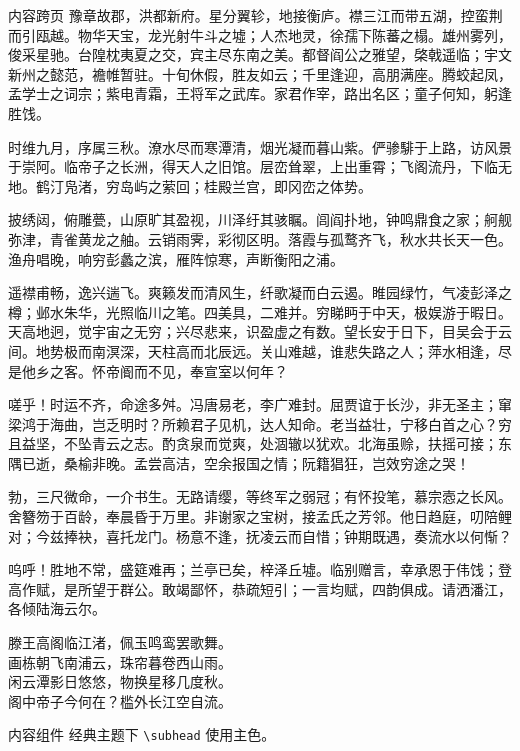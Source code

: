 \documentclass[aspectratio=169]{ctexbeamer} %
\begin{document}
\begin{frame}[allowframebreaks]{内容跨页}
  豫章故郡，洪都新府。星分翼轸，地接衡庐。襟三江而带五湖，控蛮荆而引瓯越。物华天宝，龙光射牛斗之墟；人杰地灵，徐孺下陈蕃之榻。雄州雾列，俊采星驰。台隍枕夷夏之交，宾主尽东南之美。都督阎公之雅望，棨戟遥临；宇文新州之懿范，襜帷暂驻。十旬休假，胜友如云；千里逢迎，高朋满座。腾蛟起凤，孟学士之词宗；紫电青霜，王将军之武库。家君作宰，路出名区；童子何知，躬逢胜饯。

  时维九月，序属三秋。潦水尽而寒潭清，烟光凝而暮山紫。俨骖騑于上路，访风景于崇阿。临帝子之长洲，得天人之旧馆。层峦耸翠，上出重霄；飞阁流丹，下临无地。鹤汀凫渚，穷岛屿之萦回；桂殿兰宫，即冈峦之体势。

  披绣闼，俯雕甍，山原旷其盈视，川泽纡其骇瞩。闾阎扑地，钟鸣鼎食之家；舸舰弥津，青雀黄龙之舳。云销雨霁，彩彻区明。落霞与孤鹜齐飞，秋水共长天一色。渔舟唱晚，响穷彭蠡之滨，雁阵惊寒，声断衡阳之浦。

  遥襟甫畅，逸兴遄飞。爽籁发而清风生，纤歌凝而白云遏。睢园绿竹，气凌彭泽之樽；邺水朱华，光照临川之笔。四美具，二难并。穷睇眄于中天，极娱游于暇日。天高地迥，觉宇宙之无穷；兴尽悲来，识盈虚之有数。望长安于日下，目吴会于云间。地势极而南溟深，天柱高而北辰远。关山难越，谁悲失路之人；萍水相逢，尽是他乡之客。怀帝阍而不见，奉宣室以何年？

  嗟乎！时运不齐，命途多舛。冯唐易老，李广难封。屈贾谊于长沙，非无圣主；窜梁鸿于海曲，岂乏明时？所赖君子见机，达人知命。老当益壮，宁移白首之心？穷且益坚，不坠青云之志。酌贪泉而觉爽，处涸辙以犹欢。北海虽赊，扶摇可接；东隅已逝，桑榆非晚。孟尝高洁，空余报国之情；阮籍猖狂，岂效穷途之哭！

  勃，三尺微命，一介书生。无路请缨，等终军之弱冠；有怀投笔，慕宗悫之长风。舍簪笏于百龄，奉晨昏于万里。非谢家之宝树，接孟氏之芳邻。他日趋庭，叨陪鲤对；今兹捧袂，喜托龙门。杨意不逢，抚凌云而自惜；钟期既遇，奏流水以何惭？

  呜呼！胜地不常，盛筵难再；兰亭已矣，梓泽丘墟。临别赠言，幸承恩于伟饯；登高作赋，是所望于群公。敢竭鄙怀，恭疏短引；一言均赋，四韵俱成。请洒潘江，各倾陆海云尔。

  \begin{center}
    滕王高阁临江渚，佩玉鸣鸾罢歌舞。\\
    画栋朝飞南浦云，珠帘暮卷西山雨。\\
    闲云潭影日悠悠，物换星移几度秋。\\
    阁中帝子今何在？槛外长江空自流。
  \end{center}
\end{frame}

\begin{frame}{内容组件}
  经典主题下 \texttt{\textbackslash subhead} 使用主色。
  \begin{center}
  \end{center}
\end{frame}
\end{document}

